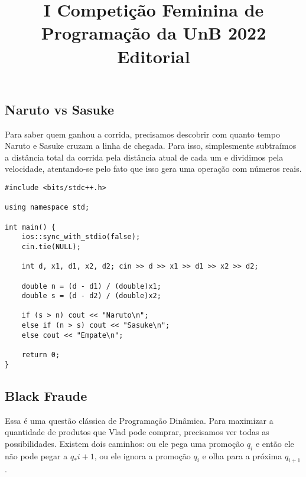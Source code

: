 \documentclass[11pt,fancychapters]{article}
\title{I Competição Feminina de Programação da UnB 2022 \\ Editorial}
\date{}
\begin{document}
\maketitle
{}
\newpage
{}
\tableofcontents
\newpage
{}

\begin{center}\section{Naruto vs Sasuke}\end{center}
\noindent
Para saber quem ganhou a corrida, precisamos descobrir com quanto tempo Naruto e Sasuke cruzam a linha de chegada. Para isso, simplesmente subtraímos a distância total da corrida pela distância atual de cada um e dividimos pela velocidade, atentando-se pelo fato que isso gera uma operação com números reais.\\
\begin{lstlisting}[style=c++]
#include <bits/stdc++.h>

using namespace std;

int main() {
    ios::sync_with_stdio(false);
    cin.tie(NULL);
    
    int d, x1, d1, x2, d2; cin >> d >> x1 >> d1 >> x2 >> d2;
    
    double n = (d - d1) / (double)x1;
    double s = (d - d2) / (double)x2;
    
    if (s > n) cout << "Naruto\n";
    else if (n > s) cout << "Sasuke\n";
    else cout << "Empate\n";

    return 0;
}    
\end{lstlisting}
\newpage
\begin{center}\section{Black Fraude}\end{center}
\noindent
Essa é uma questão clássica de Programação Dinâmica. Para maximizar a quantidade de produtos que Vlad pode comprar, precisamos ver todas as possibilidades. Existem dois caminhos: ou ele pega uma promoção $q_i$ e então ele não pode pegar a $q_*{i+1}$, ou ele ignora a promoção $q_i$ e olha para a próxima $q_{i+1}$.\\
\end{document}
